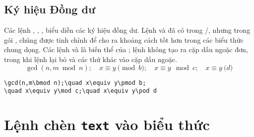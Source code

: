 \documentclass[11pt,leqno,titlepage,openany,oneside]{amsldoc}[1999/12/13]
\begin{document}
\section{Ký hiệu Đồng dư}

Các lệnh , , ,  biểu diễn các ký hiệu
đồng dư. Lệnh  và  đã có trong \latex/, nhưng trong gói
, chúng được tinh chỉnh để cho ra khoảng cách tốt hơn trong
các biểu thức chung dọng. Các lệnh  và  là biến thể của
; lệnh  không tạo ra cặp dấu ngoặc đơn, trong khi lệnh 
 lại bỏ  và các thứ khác vào cặp dấu ngoặc.
\begin{equation}
\gcd(n,m\bmod n);\quad x\equiv y\pmod b;
\quad x\equiv y\mod c;\quad x\equiv y\pod d
\end{equation}
\begin{verbatim}
\gcd(n,m\bmod n);\quad x\equiv y\pmod b;
\quad x\equiv y\mod c;\quad x\equiv y\pod d
\end{verbatim}

\chapter{Lệnh  chèn \texttt{text} vào biểu thức}\label{text}
\end{document}
